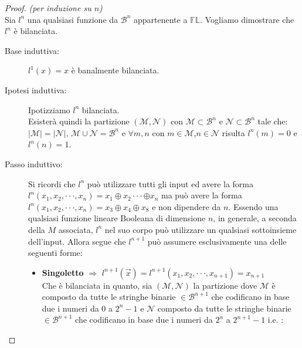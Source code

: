 \documentclass[12pt,a4paper,openright]{report}
\newcommand*\xor{\mathbin{\oplus}}
\begin{document}
\begin{proof} \textit{(per induzione su $n$)\\}
    Sia $l^n$ una qualsiasi funzione da $\mathcal{B}^n$ appartenente a $\mathbb{FL}$.  Vogliamo dimostrare che $l^n$ è bilanciata.\\
    \begin{description}
        \item[Base induttiva:] $l^1(x)=x$ è banalmente bilanciata.
        \item[Ipotesi induttiva:] Ipotizziamo $l^n$ bilanciata.\\
                                      Esisterà quindi la partizione $(\mathcal{M},\mathcal{N})$ con $\mathcal{M}\subset\mathcal{B}^n$ e $\mathcal{N}\subset\mathcal{B}^n$ tale che:\\
                                      ${\left\vert{\mathcal{M}}\right\vert} = {\left\vert{\mathcal{N}}\right\vert}$, $\mathcal{M} \cup \mathcal{N} = \mathcal{B}^n$ e $\forall m,n$ con
                                      $m\in\mathcal{M}$,$n \in\mathcal{N}$ risulta $l^n(m) = 0$ e $ l^n(n) = 1$.
        \item[Passo induttivo:] 
        Si ricordi che $l^n$ può utilizzare tutti gli input ed avere la forma $l^n(x_1,x_2,\cdot\cdot\cdot, x_n) = x_1 \xor x_2 \cdot \cdot \cdot \xor x_n $ ma può avere la forma $l^n(x_1,x_2,\cdot\cdot\cdot,x_n) = x_3 \xor x_4 \xor x_8 $ e non dipendere da
        $n$. Essendo una qualsiasi funzione lineare Booleana di dimensione $n$, in generale, a seconda della $M$ associata, $l^n$ nel suo corpo può utilizzare un qualsiasi sottoinsieme dell'input. Allora segue che $l^{n+1}$ può assumere esclusivamente una delle seguenti forme:
                                \begin{itemize}
                                    \item \textbf{Singoletto} $\Rightarrow$ $l^{n+1}(\vec{x}) = l^{n+1}(x_1,x_2,\cdot\cdot\cdot,x_{n+1})=x_{n+1}$\\
                                                              Che è bilanciata in quanto, sia $(\mathcal{M},\mathcal{N})$ la partizione dove $\mathcal{M}$ è composto da tutte le stringhe
                                                              binarie $\in \mathcal{B}^{n+1}$ che codificano in base due i numeri da $0$ a $2^n - 1$ e $\mathcal{N}$ composto da tutte le stringhe binarie
                                                              $\in \mathcal{B}^{n+1}$ che codificano in base due i numeri da $2^n$ a $2^{n+1} - 1$ i.e. :\\

\end{itemize}
\end{description}
\end{proof}
\end{document}
